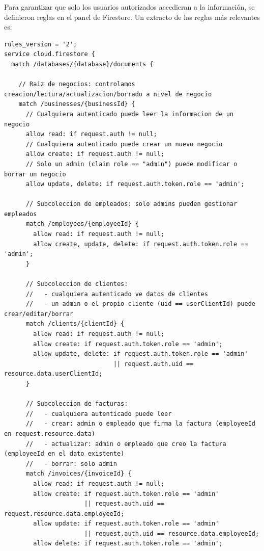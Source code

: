 \begin{large}

Para garantizar que solo los usuarios autorizados accedieran a la información, se definieron reglas en el panel de Firestore. Un extracto de las reglas más relevantes es:

\begin{lstlisting}[language={}, caption={Reglas de seguridad de Firestore}]
rules_version = '2';
service cloud.firestore {
  match /databases/{database}/documents {
    
    // Raiz de negocios: controlamos creacion/lectura/actualizacion/borrado a nivel de negocio
    match /businesses/{businessId} {
      // Cualquiera autenticado puede leer la informacion de un negocio
      allow read: if request.auth != null;
      // Cualquiera autenticado puede crear un nuevo negocio
      allow create: if request.auth != null;
      // Solo un admin (claim role == "admin") puede modificar o borrar un negocio
      allow update, delete: if request.auth.token.role == 'admin';
      
      // Subcoleccion de empleados: solo admins pueden gestionar empleados
      match /employees/{employeeId} {
        allow read: if request.auth != null;
        allow create, update, delete: if request.auth.token.role == 'admin';
      }
      
      // Subcoleccion de clientes: 
      //   - cualquiera autenticado ve datos de clientes
      //   - un admin o el propio cliente (uid == userClientId) puede crear/editar/borrar
      match /clients/{clientId} {
        allow read: if request.auth != null;
        allow create: if request.auth.token.role == 'admin';
        allow update, delete: if request.auth.token.role == 'admin'
                              || request.auth.uid == resource.data.userClientId;
      }
      
      // Subcoleccion de facturas:
      //   - cualquiera autenticado puede leer
      //   - crear: admin o empleado que firma la factura (employeeId en request.resource.data)
      //   - actualizar: admin o empleado que creo la factura (employeeId en el dato existente)
      //   - borrar: solo admin
      match /invoices/{invoiceId} {
        allow read: if request.auth != null;
        allow create: if request.auth.token.role == 'admin'
                      || request.auth.uid == request.resource.data.employeeId;
        allow update: if request.auth.token.role == 'admin'
                      || request.auth.uid == resource.data.employeeId;
        allow delete: if request.auth.token.role == 'admin';
        

\end{lstlisting}
\end{large}
